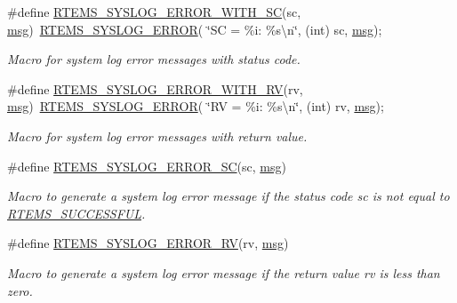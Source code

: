 \begin{Indent}
\begin{DoxyCompactItemize}
\#define \mbox{\hyperlink{group__rtems__status__checks_ga95798d6db01982fa3a7f25144d88d95b}{R\+T\+E\+M\+S\+\_\+\+S\+Y\+S\+L\+O\+G\+\_\+\+E\+R\+R\+O\+R\+\_\+\+W\+I\+T\+H\+\_\+\+SC}}(sc,  \mbox{\hyperlink{structmsg}{msg}})~\mbox{\hyperlink{group__rtems__status__checks_ga297efcfefcb8a3bf4dec6585a4884136}{R\+T\+E\+M\+S\+\_\+\+S\+Y\+S\+L\+O\+G\+\_\+\+E\+R\+R\+OR}}( \char`\"{}SC = \%i\+: \%s\textbackslash{}n\char`\"{}, (int) sc, \mbox{\hyperlink{structmsg}{msg}});
\begin{DoxyCompactList}\small\item\em Macro for system log error messages with status code. \end{DoxyCompactList}\item 
\#define \mbox{\hyperlink{group__rtems__status__checks_ga1614a89f2a0db9b898741c5f7416d0c7}{R\+T\+E\+M\+S\+\_\+\+S\+Y\+S\+L\+O\+G\+\_\+\+E\+R\+R\+O\+R\+\_\+\+W\+I\+T\+H\+\_\+\+RV}}(rv,  \mbox{\hyperlink{structmsg}{msg}})~\mbox{\hyperlink{group__rtems__status__checks_ga297efcfefcb8a3bf4dec6585a4884136}{R\+T\+E\+M\+S\+\_\+\+S\+Y\+S\+L\+O\+G\+\_\+\+E\+R\+R\+OR}}( \char`\"{}RV = \%i\+: \%s\textbackslash{}n\char`\"{}, (int) rv, \mbox{\hyperlink{structmsg}{msg}});
\begin{DoxyCompactList}\small\item\em Macro for system log error messages with return value. \end{DoxyCompactList}\item 
\#define \mbox{\hyperlink{group__rtems__status__checks_ga7ba7c9299075c60ea065d45dd69bb41c}{R\+T\+E\+M\+S\+\_\+\+S\+Y\+S\+L\+O\+G\+\_\+\+E\+R\+R\+O\+R\+\_\+\+SC}}(sc,  \mbox{\hyperlink{structmsg}{msg}})
\begin{DoxyCompactList}\small\item\em Macro to generate a system log error message if the status code {\itshape sc} is not equal to \mbox{\hyperlink{group__ClassicStatus_gga545d41846817eaba6143d52ee4d9e9fea8a23e2d94778f09399da984d73562536}{R\+T\+E\+M\+S\+\_\+\+S\+U\+C\+C\+E\+S\+S\+F\+UL}}. \end{DoxyCompactList}\item 
\#define \mbox{\hyperlink{group__rtems__status__checks_ga914d6a17fa640c983116dd476b70586d}{R\+T\+E\+M\+S\+\_\+\+S\+Y\+S\+L\+O\+G\+\_\+\+E\+R\+R\+O\+R\+\_\+\+RV}}(rv,  \mbox{\hyperlink{structmsg}{msg}})
\begin{DoxyCompactList}\small\item\em Macro to generate a system log error message if the return value {\itshape rv} is less than zero. \end{DoxyCompactList}\end{DoxyCompactItemize}
\end{Indent}
